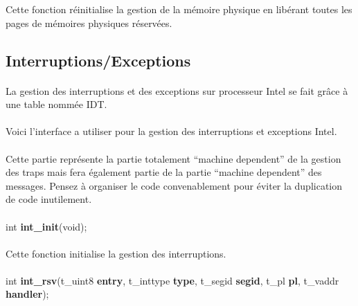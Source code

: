 \documentclass[10pt,a4wide]{article}
\begin{document}
Cette fonction r\'einitialise la gestion de la m\'emoire physique en lib\'erant
toutes les pages de m\'emoires physiques r\'eserv\'ees.

\subsection{Interruptions/Exceptions}

\paragraph{}

La gestion des interruptions et des exceptions sur processeur Intel se fait
gr\^ace \`a une table nomm\'ee IDT.

\paragraph{}

Voici l'interface a utiliser pour la gestion des interruptions et exceptions
Intel.

\paragraph{}

Cette partie repr\'esente la partie totalement ``machine dependent'' de la
gestion des traps mais fera \'egalement partie de la partie
``machine dependent'' des messages. Pensez \`a organiser le code convenablement
pour \'eviter la duplication de code inutilement.

\paragraph{}

\hspace{1.5cm}int \textbf{int\_init}(void);

\paragraph{}

Cette fonction initialise la gestion des interruptions.

\paragraph{}

\hspace{1.5cm}int \textbf{int\_rsv}(t\_uint8 \textbf{entry},
                                    t\_inttype \textbf{type},
                                    t\_segid \textbf{segid},
                                    t\_pl \textbf{pl},
                                    t\_vaddr \textbf{handler});
\end{document}

